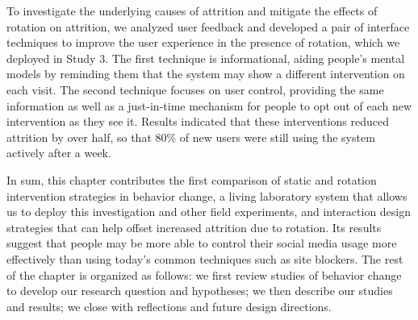 To investigate the underlying causes of attrition and mitigate the effects of rotation on attrition, we analyzed user feedback and developed a pair of interface techniques to improve the user experience in the presence of rotation, which we deployed in Study 3. The first technique is informational, aiding people's mental models by reminding them that the system may show a different intervention on each visit. The second technique focuses on user control, providing the same information as well as a just-in-time mechanism for people to opt out of each new intervention as they see it. Results indicated that these interventions reduced attrition by over half, so that $80\%$ of new users were still using the system actively after a week.

In sum, this chapter contributes the first comparison of static and rotation intervention strategies in behavior change, a living laboratory system that allows us to deploy this investigation and other field experiments, and interaction design strategies that can help offset increased attrition due to rotation. Its results suggest that people may be more able to control their social media usage more effectively than using today's common techniques such as site blockers. The rest of the chapter is organized as follows: we first review studies of behavior change to develop our research question and hypotheses; we then describe our studies and results; we close with reflections and future design directions.






